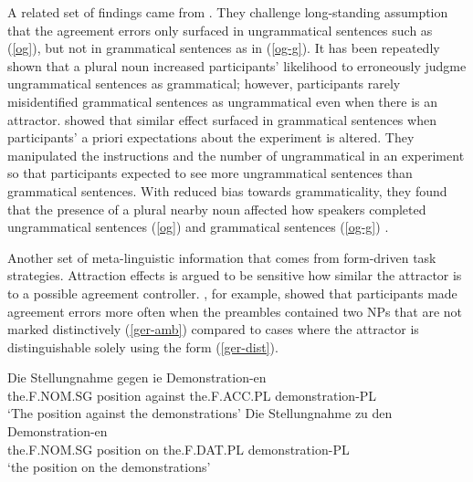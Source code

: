 \documentclass[
  authoryear,
  preprint]{elsarticle}
\begin{document}
A related set of findings came from \citet{HammerlyEtAl2019}. They
challenge long-standing assumption that the agreement errors only
surfaced in ungrammatical sentences such as (\ref{og}), but not in
grammatical sentences as in (\ref{og-g}). It has been repeatedly shown
that a plural noun increased participants' likelihood to erroneously
judgme ungrammatical sentences as grammatical; however, participants
rarely misidentified grammatical sentences as ungrammatical even when
there is an attractor. \citet{HammerlyEtAl2019} showed that similar
effect surfaced in grammatical sentences when participants' a priori
expectations about the experiment is altered. They manipulated the
instructions and the number of ungrammatical in an experiment so that
participants expected to see more ungrammatical sentences than
grammatical sentences. With reduced bias towards grammaticality, they
found that the presence of a plural nearby noun affected how speakers
completed ungrammatical sentences (\ref{og}) and grammatical sentences
(\ref{og-g}) \citep[see][ for acceptability]{Turk2022}.

\begin{exe}
\end{exe}

Another set of meta-linguistic information that comes from form-driven
task strategies. Attraction effects is argued to be sensitive how
similar the attractor is to a possible agreement controller.
\citet{HartsuikerEtAl2003}, for example, showed that participants made
agreement errors more often when the preambles contained two NPs that
are not marked distinctively (\ref{ger-amb}) compared to cases where the
attractor is distinguishable solely using the form (\ref{ger-dist}).

\begin{exe}
\ex \label{ger}
\begin{xlist}
\ex \label{ger-amb}
\gll Die Stellungnahme gegen ie Demonstration-en\\
the.F.NOM.SG position against the.F.ACC.PL demonstration-PL\\
\glt `The position against the demonstrations' 
\ex \label{ger-dist}
\gll Die Stellungnahme zu den Demonstration-en\\
the.F.NOM.SG position on the.F.DAT.PL demonstration-PL\\
\glt `the position on the demonstrations' 
\end{xlist}
\end{exe}
\end{document}
